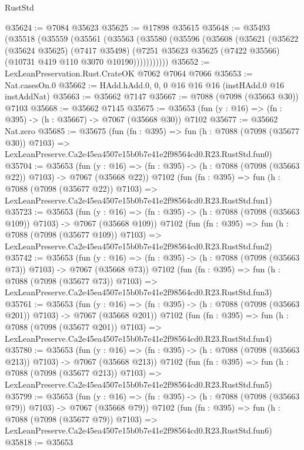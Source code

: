 \begin{lexlean}{RustStd}
\begin{coremodule}
@35624 := @7084 @35623
@35625 := @17898 @35615
@35648 := @35493
    (@35518
      (@35559
        (@35561
          (@35563
            (@35580
              (@35596
                (@35608
                  (@35621
                    (@35622
                      (@35624 @35625)
                      (@7417 @35498)
                      (@7251 @35623 @35625 (@7422 @35566) (@10731 @419 @110 @3070 @10190)))))))))))
@35652 := LexLeanPreservation.Rust.CrateOK @7062 @7064 @7066
@35653 := Nat.casesOn.{0}
@35662 := HAdd.hAdd.{0, 0, 0} @16 @16 @16 (instHAdd.{0} @16 instAddNat)
@35663 := @35662 @7147
@35667 := @7088 (@7098 (@35663 @30)) @7103
@35668 := @35662 @7145
@35675 := @35653 (fun (y : @16) => (fn : @395) -> (h : @35667) -> @7067 (@35668 @30)) @7102
@35677 := @35662 Nat.zero
@35685 := @35675
    (fun (fn : @395) =>
    fun (h : @7088 (@7098 (@35677 @30)) @7103) =>
    LexLeanPreserve.Ca2e45ea4507e15b0b7e41e2f98564cd0.R23.RustStd.fun0)
@35704 := @35653
    (fun (y : @16) => (fn : @395) -> (h : @7088 (@7098 (@35663 @22)) @7103) -> @7067 (@35668 @22))
    @7102
    (fun (fn : @395) =>
    fun (h : @7088 (@7098 (@35677 @22)) @7103) =>
    LexLeanPreserve.Ca2e45ea4507e15b0b7e41e2f98564cd0.R23.RustStd.fun1)
@35723 := @35653
    (fun (y : @16) => (fn : @395) -> (h : @7088 (@7098 (@35663 @109)) @7103) -> @7067 (@35668 @109))
    @7102
    (fun (fn : @395) =>
    fun (h : @7088 (@7098 (@35677 @109)) @7103) =>
    LexLeanPreserve.Ca2e45ea4507e15b0b7e41e2f98564cd0.R23.RustStd.fun2)
@35742 := @35653
    (fun (y : @16) => (fn : @395) -> (h : @7088 (@7098 (@35663 @73)) @7103) -> @7067 (@35668 @73))
    @7102
    (fun (fn : @395) =>
    fun (h : @7088 (@7098 (@35677 @73)) @7103) =>
    LexLeanPreserve.Ca2e45ea4507e15b0b7e41e2f98564cd0.R23.RustStd.fun3)
@35761 := @35653
    (fun (y : @16) => (fn : @395) -> (h : @7088 (@7098 (@35663 @201)) @7103) -> @7067 (@35668 @201))
    @7102
    (fun (fn : @395) =>
    fun (h : @7088 (@7098 (@35677 @201)) @7103) =>
    LexLeanPreserve.Ca2e45ea4507e15b0b7e41e2f98564cd0.R23.RustStd.fun4)
@35780 := @35653
    (fun (y : @16) => (fn : @395) -> (h : @7088 (@7098 (@35663 @213)) @7103) -> @7067 (@35668 @213))
    @7102
    (fun (fn : @395) =>
    fun (h : @7088 (@7098 (@35677 @213)) @7103) =>
    LexLeanPreserve.Ca2e45ea4507e15b0b7e41e2f98564cd0.R23.RustStd.fun5)
@35799 := @35653
    (fun (y : @16) => (fn : @395) -> (h : @7088 (@7098 (@35663 @79)) @7103) -> @7067 (@35668 @79))
    @7102
    (fun (fn : @395) =>
    fun (h : @7088 (@7098 (@35677 @79)) @7103) =>
    LexLeanPreserve.Ca2e45ea4507e15b0b7e41e2f98564cd0.R23.RustStd.fun6)
@35818 := @35653

\end{coremodule}
\end{lexlean}
